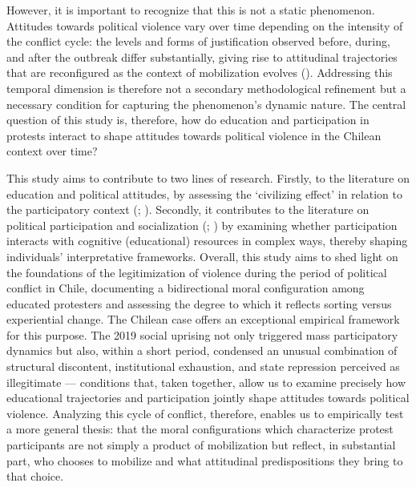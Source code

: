 \documentclass[
  13pt,
]{article}
\begin{document}
However, it is important to recognize that this is not a static
phenomenon. Attitudes towards political violence vary over time
depending on the intensity of the conflict cycle: the levels and forms
of justification observed before, during, and after the outbreak differ
substantially, giving rise to attitudinal trajectories that are
reconfigured as the context of mobilization evolves
().
Addressing this temporal dimension is therefore not a secondary
methodological refinement but a necessary condition for capturing the
phenomenon's dynamic nature. The central question of this study is,
therefore, how do education and participation in protests interact to
shape attitudes towards political violence in the Chilean context over
time?

This study aims to contribute to two lines of research. Firstly, to the
literature on education and political attitudes, by assessing the
`civilizing effect' in relation to the participatory context
(;
). Secondly, it
contributes to the literature on political participation and
socialization (; ) by examining
whether participation interacts with cognitive (educational) resources
in complex ways, thereby shaping individuals' interpretative frameworks.
Overall, this study aims to shed light on the foundations of the
legitimization of violence during the period of political conflict in
Chile, documenting a bidirectional moral configuration among educated
protesters and assessing the degree to which it reflects sorting versus
experiential change. The Chilean case offers an exceptional empirical
framework for this purpose. The 2019 social uprising not only triggered
mass participatory dynamics but also, within a short period, condensed
an unusual combination of structural discontent, institutional
exhaustion, and state repression perceived as illegitimate ---
conditions that, taken together, allow us to examine precisely how
educational trajectories and participation jointly shape attitudes
towards political violence. Analyzing this cycle of conflict, therefore,
enables us to empirically test a more general thesis: that the moral
configurations which characterize protest participants are not simply a
product of mobilization but reflect, in substantial part, who chooses to
mobilize and what attitudinal predispositions they bring to that choice.
\end{document}
